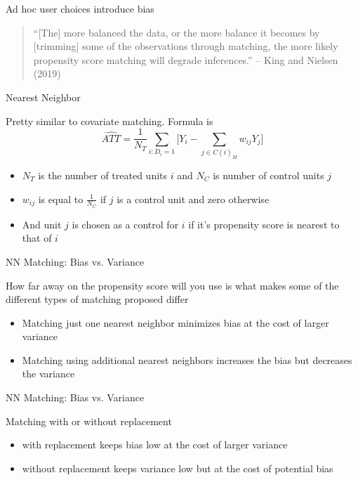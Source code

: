 \documentclass{beamer}
\begin{document}
\begin{frame}{Ad hoc user choices introduce bias}

\begin{quote}
	
``[The] more balanced the data, or the more balance it becomes by [trimming] some of the observations through matching, the more likely propensity score matching will degrade inferences.'' -- King and Nielsen (2019)

\end{quote}
	
\end{frame}



\begin{frame}{Nearest Neighbor}
	
	Pretty similar to covariate matching.  Formula is $$\widehat{ATT} = \frac{1}{N_T} \sum_{i:D_i=1} \bigg [ Y_i - \sum_{j \in C(i)_M} w_{ij}Y_j \bigg ]$$ 
		\begin{itemize}
		\item $N_T$ is the number of treated units $i$ and  $N_C$ is number of control units $j$
		\item $w_{ij}$ is equal to $\frac{1}{N_C}$ if $j$ is a control unit and zero otherwise
		\item And unit $j$ is chosen as a control for $i$ if it's propensity score is nearest to that of $i$
		\end{itemize}
\end{frame}

\begin{frame}{NN Matching: Bias vs. Variance}
	
How far away on the propensity score will you use is what makes some of the different types of matching proposed differ
		\begin{itemize}
		\item Matching just one nearest neighbor minimizes bias at the cost of larger variance
		\item Matching using additional nearest neighbors increases the bias but decreases the variance
		\end{itemize}
	
\end{frame}

\begin{frame}{NN Matching: Bias vs. Variance}
	
	 Matching with or without replacement
		\begin{itemize}
		\item with replacement keeps bias low at the cost of larger variance
		\item without replacement keeps variance low but at the cost of potential bias
		\end{itemize}
	
\end{frame}
\end{document}
